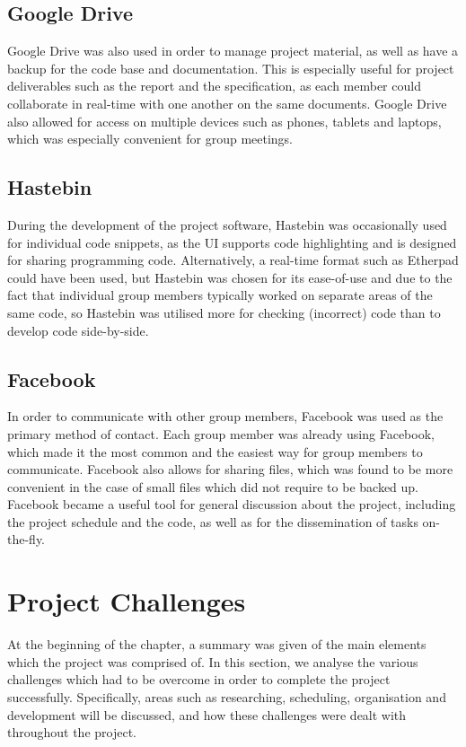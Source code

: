 		\subsection{Google Drive}
Google Drive was also used in order to manage project material, as well as have a backup for the code base and documentation. This is especially useful for project deliverables such as the report and the specification, as each member could collaborate in real-time with one another on the same documents. Google Drive also allowed for access on multiple devices such as phones, tablets and laptops, which was especially convenient for group meetings.
		\subsection{Hastebin}
During the development of the project software, Hastebin was occasionally used for individual code snippets, as the UI supports code highlighting and is designed for sharing programming code. Alternatively, a real-time format such as Etherpad could have been used, but Hastebin was chosen for its ease-of-use and due to the fact that individual group members typically worked on separate areas of the same code, so Hastebin was utilised more for checking (incorrect) code than to develop code side-by-side.
		\subsection{Facebook}
In order to communicate with other group members, Facebook was used as the primary method of contact. Each group member was already using Facebook, which made it the most common and the easiest way for group members to communicate. Facebook also allows for sharing files, which was found to be more convenient in the case of small files which did not require to be backed up. Facebook became a useful tool for general discussion about the project, including the project schedule and the code, as well as for the dissemination of tasks on-the-fly.
	\section{Project Challenges}
At the beginning of the chapter, a summary was given of the main elements which the project was comprised of. In this section, we analyse the various challenges which had to be overcome in order to complete the project successfully. Specifically, areas such as researching, scheduling, organisation and development will be discussed, and how these challenges were dealt with throughout the project. 
